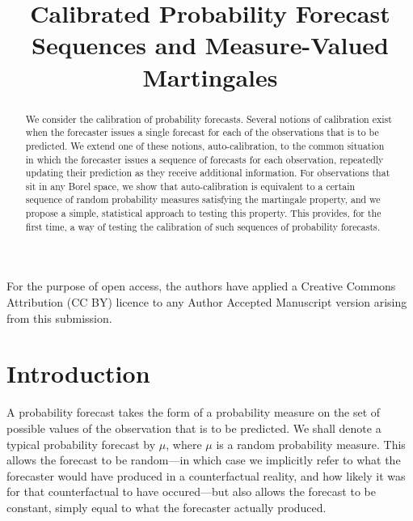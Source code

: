 \documentclass[aap]{imsart}
\theoremstyle{plain}
\theoremstyle{definition}
\begin{document}
\begin{frontmatter}
\title{Calibrated Probability Forecast Sequences and Measure-Valued Martingales}


\begin{abstract}
We consider the calibration of probability forecasts. Several notions of calibration exist when the forecaster issues a single forecast for each of the observations that is to be predicted. We extend one of these notions, auto-calibration, to the common situation in which the forecaster issues a sequence of forecasts for each observation, repeatedly updating their prediction as they receive additional information. For observations that sit in any Borel space, we show that auto-calibration is equivalent to a certain sequence of random probability measures satisfying the martingale property, and we propose a simple, statistical approach to testing this property. This provides, for the first time, a way of testing the calibration of such sequences of probability forecasts.
\end{abstract}

\begin{keyword}[class=MSC]
\end{keyword}

\begin{keyword}
\end{keyword}

\end{frontmatter}

For the purpose of open access, the authors have applied a Creative Commons Attribution (CC BY) licence to any Author Accepted Manuscript version arising from this submission.

\section{Introduction}
A probability forecast takes the form of a probability measure on the set of possible values of the observation that is to be predicted. We shall denote a typical probability forecast by $\mu$, where $\mu$ is a random probability measure. This allows the forecast to be random---in which case we implicitly refer to what the forecaster would have produced in a counterfactual reality, and how likely it was for that counterfactual to have occured---but also allows the forecast to be constant, simply equal to what the forecaster actually produced.
\end{document}

